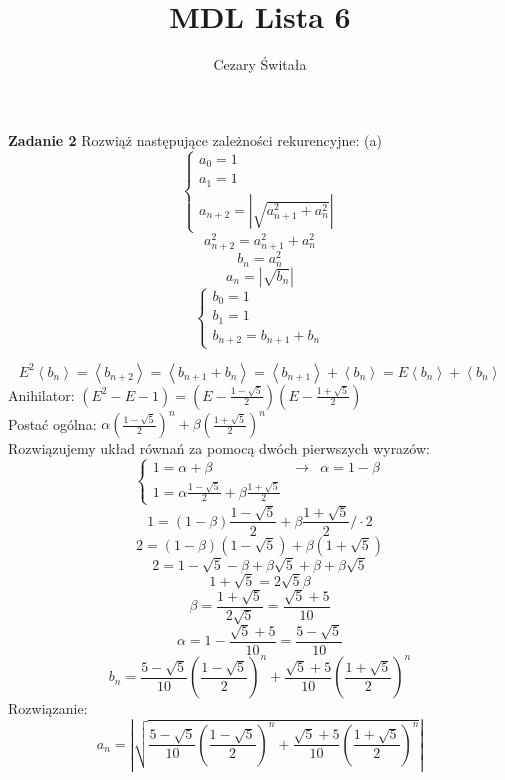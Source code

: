 \documentclass[12pt,a4paper]{article}
\title{MDL Lista 6}
\author{Cezary Świtała}
\begin{document}
\maketitle

\noindent
\textbf{Zadanie 2} Rozwiąż następujące zależności rekurencyjne:
\vskip 0.1cm
(a)
\[
	\left\{ 
	\begin{array}{l}
		a_0 = 1 \\
		a_1 = 1 \\
		a_{n + 2 } = \left\lvert \sqrt{a_{n+1}^2 + a_n^2} \right\rvert
	\end{array} 
	\right.
\]
\[
 a_{n + 2}^2 =  a_{n+1}^2 + a_n^2
\]
\[
 b_n = a_n^2
\]
\[
 a_n = \left\lvert \sqrt{b_n} \right\rvert
\]
\[
	\left\{ 
	\begin{array}{l}
		b_0 = 1 \\
		b_1 = 1 \\
		b_{n+2} = b_{n+1} + b_n 
	\end{array} 
	\right.
\]

\[
	E^2 \left< b_n \right> = \left< b_{n+2} \right> = \left< b_{n+1} + b_n \right> 
	= \left< b_{n + 1} \right> + \left< b_n \right>
	= E\left< b_n \right> + \left< b_n \right>
\]
Anihilator: \((E^2 - E - 1) = (E - \frac{1 - \sqrt{5}}{2})(E - \frac{1 + \sqrt{5}}{2})\) \\
Postać ogólna: \( \alpha(\frac{1 - \sqrt{5}}{2})^n + \beta(\frac{1 + \sqrt{5}}{2})^n \) \\
Rozwiązujemy układ równań za pomocą dwóch pierwszych wyrazów:
\[
	\left\{ 
	\begin{array}{lll}
		1 = \alpha + \beta & \rightarrow & \alpha = 1 - \beta \\
		1 = \alpha\frac{1 - \sqrt{5}}{2} + \beta\frac{1 + \sqrt{5}}{2} \
	\end{array} 
	\right.
\]
\[
	1 = (1 - \beta)\frac{1 - \sqrt{5}}{2} + \beta\frac{1 + \sqrt{5}}{2} /\cdot2
\]
\[
	2 = (1 - \beta)(1 - \sqrt{5}) + \beta(1 + \sqrt{5})
\]
\[
	2 = 1 - \sqrt{5} - \beta + \beta\sqrt{5} + \beta + \beta\sqrt{5}
\]
\[
	1 + \sqrt{5} = 2\sqrt{5}\beta
\]
\[
	\beta  = \frac{1 + \sqrt{5}}{2\sqrt{5}} = \frac{\sqrt{5} + 5}{10}
\]
\[
	\alpha = 1 - \frac{\sqrt{5} + 5}{10} = \frac{5 - \sqrt{5}}{10}
\]
\[
	b_n = \frac{5 
	- \sqrt{5}}{10}\left(\frac{1 - \sqrt{5}}{2}\right)^n 
	+ \frac{\sqrt{5} + 5}{10}\left(\frac{1 + \sqrt{5}}{2}\right)^n
\]
Rozwiązanie:
\[
	a_n = \left\lvert 
	\sqrt{
		\frac{5 
		- \sqrt{5}}{10}\left(\frac{1 - \sqrt{5}}{2}\right)^n 
		+ \frac{\sqrt{5} + 5}{10}\left(\frac{1 + \sqrt{5}}{2}\right)^n}
	\right\rvert
\]
\end{document}
